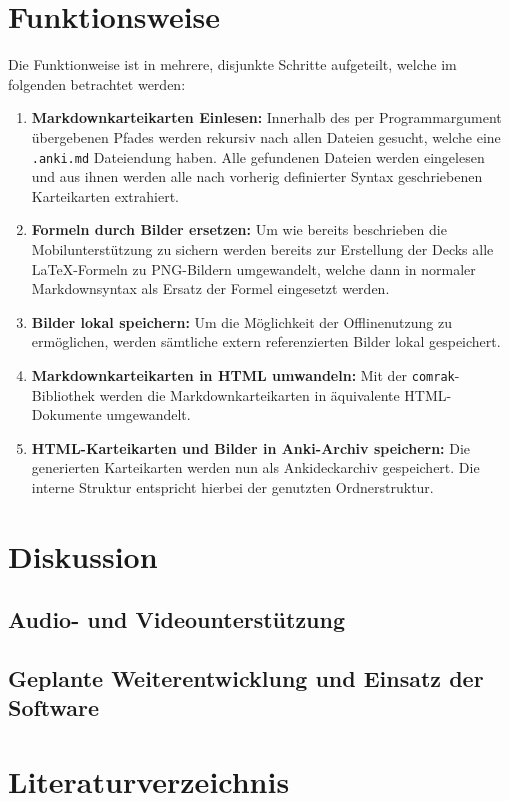 \documentclass[ngerman]{article}
\begin{document}
\section{Funktionsweise}
Die Funktionweise ist in mehrere, disjunkte Schritte aufgeteilt, welche im folgenden betrachtet werden:
\begin{enumerate}
  \item \textbf{Markdownkarteikarten Einlesen:} Innerhalb des per Programmargument übergebenen Pfades werden rekursiv nach allen Dateien gesucht, welche eine \texttt{.anki.md} Dateiendung haben. Alle gefundenen Dateien werden eingelesen und aus ihnen werden alle nach vorherig definierter Syntax geschriebenen Karteikarten extrahiert.
  \item \textbf{Formeln durch Bilder ersetzen:} Um wie bereits beschrieben die Mobilunterstützung zu sichern werden bereits zur Erstellung der Decks alle \LaTeX-Formeln zu PNG-Bildern umgewandelt, welche dann in normaler Markdownsyntax als Ersatz der Formel eingesetzt werden.
  \item \textbf{Bilder lokal speichern:} Um die Möglichkeit der Offlinenutzung zu ermöglichen, werden sämtliche extern referenzierten Bilder lokal gespeichert.
  \item \textbf{Markdownkarteikarten in HTML umwandeln:} Mit der \texttt{comrak}-Bibliothek \cite{comrak} werden die Markdownkarteikarten in äquivalente HTML-Dokumente umgewandelt.
  \item \textbf{HTML-Karteikarten und Bilder in Anki-Archiv speichern:} Die generierten Karteikarten werden nun als Ankideckarchiv gespeichert. Die interne Struktur entspricht hierbei der genutzten Ordnerstruktur.
\end{enumerate}
\section{Diskussion}
\subsection{Audio- und Videounterst\"utzung}
\subsection{Geplante Weiterentwicklung und Einsatz der Software}
\newpage
\section{Literaturverzeichnis}
\printbibliography
\end{document}
